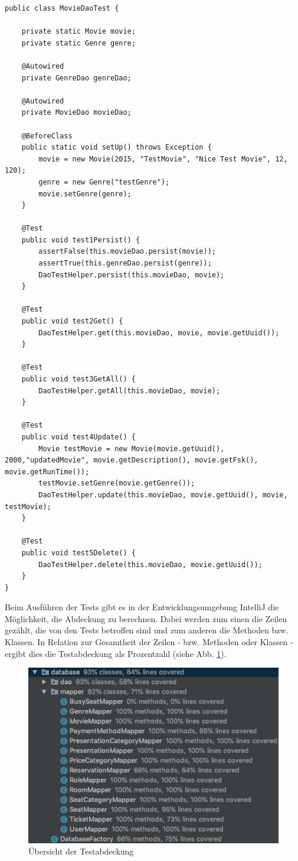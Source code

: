 	\begin{lstlisting}
public class MovieDaoTest {

	private static Movie movie;
	private static Genre genre;
	
	@Autowired
	private GenreDao genreDao;
	
	@Autowired
	private MovieDao movieDao;
	
	@BeforeClass
	public static void setUp() throws Exception {
		movie = new Movie(2015, "TestMovie", "Nice Test Movie", 12, 120);
		genre = new Genre("testGenre");
		movie.setGenre(genre);
	}
	
	@Test
	public void test1Persist() {
		assertFalse(this.movieDao.persist(movie));
		assertTrue(this.genreDao.persist(genre));
		DaoTestHelper.persist(this.movieDao, movie);
	}
	
	@Test
	public void test2Get() {
		DaoTestHelper.get(this.movieDao, movie, movie.getUuid());
	}
	
	@Test
	public void test3GetAll() {
		DaoTestHelper.getAll(this.movieDao, movie);
	}
	
	@Test
	public void test4Update() {
		Movie testMovie = new Movie(movie.getUuid(), 2000,"updatedMovie", movie.getDescription(), movie.getFsk(), movie.getRunTime());
		testMovie.setGenre(movie.getGenre());
		DaoTestHelper.update(this.movieDao, movie.getUuid(), movie, testMovie);
	}
	
	@Test
	public void test5Delete() {
		DaoTestHelper.delete(this.movieDao, movie.getUuid());
	}
}
	\end{lstlisting}
	Beim Ausführen der Tests gibt es in der Entwicklungsumgebung IntelliJ die Möglichkeit, die Abdeckung zu berechnen. Dabei werden zum einen die Zeilen gezählt, die von den Tests betroffen sind und zum anderen die Methoden bzw. Klassen. In Relation zur Gesamtheit der Zeilen - bzw. Methoden oder Klassen - ergibt dies die Testabdeckung als Prozentzahl (siehe Abb. \ref{fig:TestCoverage}).\newline
	\begin{figure} [H]
		\centering 
		\includegraphics[scale=0.6]{img/testCoverage.png}
		\captionsetup{format=hang}
		\centering\caption[Testabdeckung]{\label{fig:TestCoverage} Übersicht der Testabdeckung}
	\end{figure}
